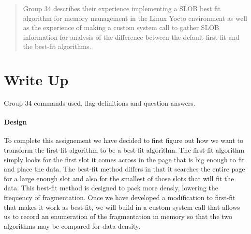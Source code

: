 \documentclass[titlepage,draftclsnofoot,onecolumn]{article}
\begin{document}
\maketitle

\begin{abstract}
  Group 34 describes their experience implementing a SLOB best fit algorithm for memory management in the Linux Yocto environment as well as the experience of making a custom system call to gather SLOB information for analysis of the difference between the default first-fit and the best-fit algorithms.
\end{abstract}

\section*{Write Up}
Group 34 commands used, flag definitions and question answers.

\paragraph{Design}
To complete this assignement we have decided to first figure out how we want to transform the first-fit algorithm to be a best-fit algorithm. The first-fit algorithm simply looks for the first slot it comes across in the page that is big enough to fit and place the data. The best-fit method differs in that it searches the entire page for a large enough slot and also for the smallest of those slots that will fit the data. This best-fit method is designed to pack more densly, lowering the frequency of fragmentation. Once we have developed a modification to first-fit that makes it work as best-fit, we will build in a custom system call that allows us to record an enumeration of the fragmentation in memory so that the two algorithms may be compared for data density.
\end{document}
